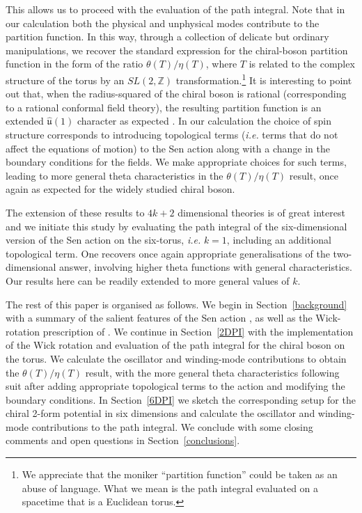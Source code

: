 \documentclass[11pt]{article}
\numberwithin{equation}{section}
\begin{document}
This allows us to proceed with the evaluation of the path integral. Note that in our calculation both the physical and unphysical modes contribute to the partition function. In this way, through a collection of delicate but ordinary manipulations, we recover the standard expression for the chiral-boson partition function in the form of the ratio $\theta (  T)/\eta(T)$, where $T$ is related to the complex structure of the torus by an $SL(2,{\mathbb Z})$ transformation.\footnote{We appreciate that the moniker ``partition function'' could be taken as an abuse of language. What we mean is the path integral evaluated on a spacetime that is a Euclidean torus.} It is interesting to point out that,  when the radius-squared of the chiral boson is rational (corresponding to a rational conformal field theory), the resulting partition function is an extended  $\widehat{\mathfrak{u}}(1)$ character as expected \cite{Moore:1988qv,Moore:1989yh,Elitzur:1989nr}. In our calculation the choice of spin structure corresponds to introducing topological terms ({\it i.e.} terms that do not affect the equations of motion) to the Sen action along with a  change in the boundary conditions for the fields. We make appropriate choices for such terms, leading to more general theta characteristics in the $\theta (  T )/\eta(T)$ result, once again as expected for the widely studied chiral boson. 

The extension of these results to $4k+2$ dimensional theories is of great interest and we initiate this study by evaluating the path integral of the six-dimensional version of the Sen action on the six-torus, {\it i.e.} $k=1$, including an additional topological term. One recovers once again appropriate generalisations of the two-dimensional answer, involving higher theta functions with general characteristics. Our results here can be readily extended to more general values of $k$. 

The rest of this paper is organised as follows. We begin in Section~\ref{background} with a summary of the salient features of the Sen action \cite{Sen:2015nph,Sen:2019qit}, as well as the Wick-rotation prescription of \cite{Visser:2017atf}. We continue in Section~\ref{2DPI} with the implementation of the Wick rotation and evaluation of the path integral for the chiral boson on the torus. We calculate the oscillator and winding-mode contributions to obtain the $\theta (  T )/\eta(T)$ result, with the more general theta characteristics following suit after adding appropriate topological terms to the action and modifying the boundary conditions. In Section~\ref{6DPI} we sketch the corresponding setup for the chiral 2-form potential in six dimensions and calculate the oscillator and winding-mode contributions to the path integral.  We conclude with some closing comments and open questions in Section~\ref{conclusions}.
\end{document}
